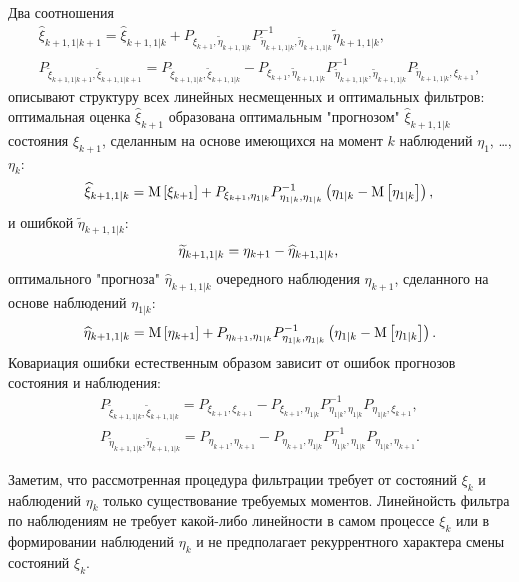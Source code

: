 Два соотношения
\begin{gather}
	\widehat{\xi}_{k+1,1|k+1}
		= \widehat{\xi}_{k+1,1|k}
		+ P_{\xi_{k+1}, \widetilde{\eta}_{k+1,1|k}} P_{\widetilde{\eta}_{k+1, 1|k}, \widetilde{\eta}_{k+1, 1|k}}^{-1}  \widetilde{\eta}_{k+1,1|k} ,
		\label{equation:filtering:in_states:process:optimal_estimate} \\
	P_{\widetilde{\xi}_{k+1,1|k+1}, \widetilde{\xi}_{k+1,1|k+1}}
		= P_{\widetilde{\xi}_{k+1,1|k},\widetilde{\xi}_{k+1,1|k}}
		- P_{\xi_{k+1}, \widetilde{\eta}_{k+1,1|k}} P_{\widetilde{\eta}_{k+1, 1|k}, \widetilde{\eta}_{k+1, 1|k}}^{-1} P_{\widetilde{\eta}_{k+1,1|k}, \xi_{k+1}} ,
		\label{equation:filtering:in_states:process:optimal_error_covariance}
\end{gather}
описывают структуру всех линейных несмещенных и оптимальных фильтров: оптимальная оценка $\widehat{\xi}_{k+1}$ образована оптимальным "прогнозом"{}
$\widehat{\xi}_{k+1,1|k}$ состояния $\xi_{k+1}$, сделанным на основе имеющихся на момент $k$ наблюдений $\eta_{1}$, \dots, $\eta_k$:
$$
	\widehat{\xi}_{k+1,1|k} = \mathrm{M} \left [ \xi_{k+1} \right ] + P_{\xi_{k+1}, \eta_{1|k}} P_{\eta_{1|k}, \eta_{1|k}}^{-1} \left ( \eta_{1|k} - \mathrm{M} \left [ \eta_{1|k} \right ] \right ) , \\
$$
и ошибкой $\widetilde{\eta}_{k+1,1|k}$:
$$
	\widetilde{\eta}_{k+1,1|k} = \eta_{k+1} - \widehat{\eta}_{k+1, 1|k} , \\
$$
оптимального "прогноза"{} $\widehat{\eta}_{k+1, 1|k}$ очередного наблюдения $\eta_{k+1}$, сделанного на основе наблюдений $\eta_{1|k}$:
$$
	\widehat{\eta}_{k+1,1|k} = \mathrm{M} \left [ \eta_{k+1} \right ] + P_{\eta_{k+1}, \eta_{1|k}} P_{\eta_{1|k}, \eta_{1|k}}^{-1} \left ( \eta_{1|k} - \mathrm{M} \left [ \eta_{1|k} \right ] \right ) .
$$
Ковариация ошибки естественным образом зависит от ошибок прогнозов состояния и наблюдения:
\begin{gather*}
	P_{\widetilde{\xi}_{k+1, 1|k}, \widetilde{\xi}_{k+1, 1|k}} = P_{\xi_{k+1}, \xi_{k+1}} - P_{\xi_{k+1}, \eta_{1|k}} P_{\eta_{1|k},\eta_{1|k}}^{-1} P_{\eta_{1|k}, \xi_{k+1}} , \\
	P_{\widetilde{\eta}_{k+1, 1|k}, \widetilde{\eta}_{k+1, 1|k}} = P_{\eta_{k+1}, \eta_{k+1}} - P_{\eta_{k+1}, \eta_{1|k}} P_{\eta_{1|k},\eta_{1|k}}^{-1} P_{\eta_{1|k}, \eta_{k+1}} .
\end{gather*}

Заметим, что рассмотренная процедура фильтрации требует от состояний $\xi_k$ и наблюдений $\eta_k$ только существование требуемых моментов. Линейнойсть фильтра по наблюдениям
не требует какой-либо линейности в самом процессе $\xi_k$ или в формировании наблюдений $\eta_k$ и не предполагает рекуррентного характера смены состояний $\xi_k$.